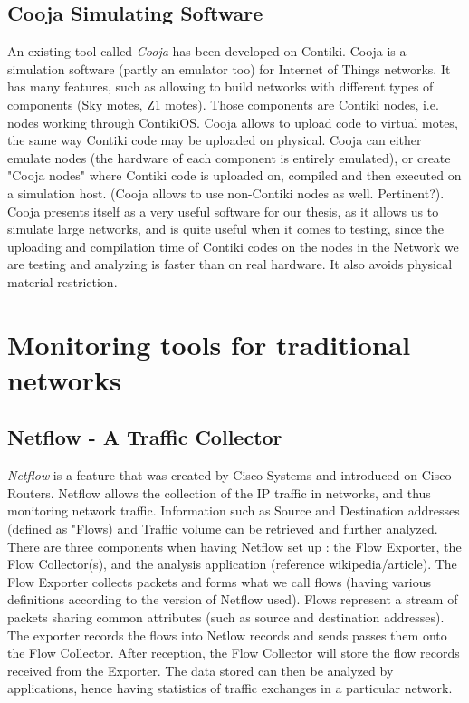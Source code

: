 \subsection{Cooja Simulating Software}
An existing tool called \textit{Cooja} has been developed on Contiki. Cooja is a simulation software (partly an emulator too) for Internet of Things networks. It has many features, such as allowing to build networks with different types of components (Sky motes, Z1 motes). Those components are Contiki nodes, i.e. nodes working through ContikiOS. Cooja allows to upload code to virtual motes, the same way Contiki code may be uploaded on physical. Cooja can either emulate nodes (the hardware of each component is entirely emulated), or create "Cooja nodes" where Contiki code is uploaded on, compiled and then executed on a simulation host. (Cooja allows to use non-Contiki nodes as well. Pertinent?). Cooja presents itself as a very useful software for our thesis, as it allows us to simulate large networks, and is quite useful when it comes to testing, since the uploading and compilation time of Contiki codes on the nodes in the Network we are testing and analyzing is faster than on real hardware. It also avoids physical material restriction.

\section{Monitoring tools for traditional networks}

\subsection{Netflow - A Traffic Collector}
\textit{Netflow} is a feature that was created by Cisco Systems and introduced on Cisco Routers. Netflow allows the collection of the IP traffic in networks, and thus monitoring network traffic. Information such as Source and Destination addresses (defined as "Flows) and Traffic volume can be retrieved and further analyzed.\\

There are three components when having Netflow set up : the Flow Exporter, the Flow Collector(s), and the analysis application (reference wikipedia/article). The Flow Exporter collects packets and forms what we call flows (having various definitions according to the version of Netflow used). Flows represent a stream of packets sharing common attributes (such as source and destination addresses). The exporter records the flows into Netlow records and sends passes them onto the Flow Collector. After reception, the Flow Collector will store the flow records received from the Exporter. The data stored can then be analyzed by applications, hence having statistics of traffic exchanges in a particular network.\\

